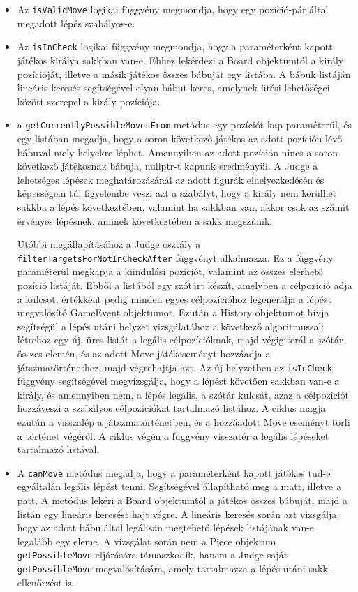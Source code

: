 \documentclass[12pt, twoside]{report}
\begin{document}
\begin{itemize}
	\item Az {\tt isValidMove} logikai függvény megmondja, hogy egy pozíció-pár által megadott lépés szabályos-e.
	
	\item Az {\tt isInCheck} logikai függvény megmondja, hogy a paraméterként kapott játékos királya sakkban van-e. Ehhez lekérdezi a Board objektumtól a király pozícióját, illetve a másik játékos összes bábuját egy listába. A bábuk listáján lineáris keresés segítségével olyan bábut keres, amelynek ütési lehetőségei között szerepel a király pozíciója.
	
	\item a {\tt getCurrentlyPossibleMovesFrom} metódus egy pozíciót kap paraméterül,  és egy listában megadja, hogy a soron következő játékos az adott pozíción lévő bábuval mely helyekre léphet. Amennyiben az adott pozíción nincs a soron következő játékosnak bábuja, nullptr-t kapunk eredményül. A Judge a lehetséges lépések meghatározásánál az adott figurák elhelyezkedésén és képességein túl figyelembe veszi azt a szabályt, hogy a király nem kerülhet sakkba a lépés következtében, valamint ha sakkban van, akkor csak az számít érvényes lépésnek, aminek következtében a sakk megszűnik.
	
	Utóbbi megállapításához a Judge osztály a {\tt filterTargetsForNotInCheckAfter} függvényt alkalmazza. Ez a függvény paraméterül megkapja a kiindulási pozíciót, valamint az összes elérhető pozíció listáját. Ebből a listából egy szótárt készít, amelyben a célpozíció adja a kulcsot, értékként pedig minden egyes célpozícióhoz legenerálja a lépést megvalósító GameEvent objektumot. Ezután a History objektumot hívja segítségül a lépés utáni helyzet vizsgálatához a következő algoritmussal: létrehoz egy új, üres listát a legális célpozícióknak, majd végigiterál a szótár összes elemén, és az adott Move játékeseményt hozzáadja a játszmatörténethez, majd végrehajtja azt. Az új helyzetben az {\tt isInCheck} függvény segítségével megvizsgálja, hogy a lépést követően sakkban van-e a király, és amennyiben nem, a lépés legális, a szótár kulcsát, azaz a célpozíciót hozzáveszi a szabályos célpozíciókat tartalmazó listához. A ciklus magja ezután a visszalép a játszmatörténetben, és a hozzáadott Move eseményt törli a történet végéről. A ciklus végén a függvény visszatér a legális lépéseket tartalmazó listával. 

	\item A {\tt canMove} metódus megadja, hogy a paraméterként kapott játékos tud-e egyáltalán legális lépést tenni. Segítségével állapítható meg a matt, illetve a patt. A metódus lekéri a Board objektumtól a játékos összes bábuját, majd a listán egy lineáris keresést hajt végre. A lineáris keresés során azt vizsgálja, hogy az adott bábu által legálisan megtehető lépések listájának van-e legalább egy eleme. A vizsgálat során nem a Piece objektum {\tt getPossibleMove} eljárására támaszkodik, hanem a Judge saját {\tt getPossibleMove} megvalósítására, amely tartalmazza a lépés utáni sakk-ellenőrzést is.
	

\end{itemize}
\end{document}

